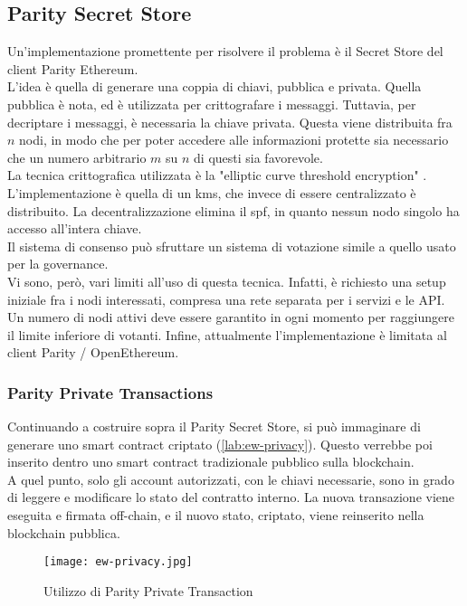 \subsection{Parity Secret Store}
Un'implementazione promettente per risolvere il problema è il Secret Store del client Parity Ethereum. \\
L'idea è quella di generare una coppia di chiavi, pubblica e privata.
Quella pubblica è nota, ed è utilizzata per crittografare i messaggi.
Tuttavia, per decriptare i messaggi, è necessaria la chiave privata.
Questa viene distribuita fra $n$ nodi, in modo che per poter accedere alle informazioni protette sia necessario che un numero arbitrario $m$ su $n$ di questi sia favorevole. \\
La tecnica crittografica utilizzata è la "elliptic curve threshold encryption" \cite{art:ecdkg}. \\
L'implementazione è quella di un \gls{kms}, che invece di essere centralizzato è distribuito.
La decentralizzazione elimina il \gls{spf}, in quanto nessun nodo singolo ha accesso all'intera chiave. \\
Il sistema di consenso può sfruttare un sistema di votazione simile a quello usato per la governance. \\
Vi sono, però, vari limiti all'uso di questa tecnica.
Infatti, è richiesto una setup iniziale fra i nodi interessati, compresa una rete separata per i servizi e le API.
Un numero di nodi attivi deve essere garantito in ogni momento per raggiungere il limite inferiore di votanti.
Infine, attualmente l'implementazione è limitata al client Parity / OpenEthereum.

\subsubsection{Parity Private Transactions}
Continuando a costruire sopra il Parity Secret Store, si può immaginare di generare uno smart contract criptato (\autoref{lab:ew-privacy}).
Questo verrebbe poi inserito dentro uno smart contract tradizionale pubblico sulla blockchain. \\
A quel punto, solo gli account autorizzati, con le chiavi necessarie, sono in grado di leggere e modificare lo stato del contratto interno.
La nuova transazione viene eseguita e firmata off-chain, e il nuovo stato, criptato, viene reinserito nella blockchain pubblica.

\begin{figure}[ht]
    \texttt{[image: ew-privacy.jpg]}
    \centering
    \caption{Utilizzo di Parity Private Transaction \cite{img:ew-privacy}}
    \label{lab:ew-privacy}
\end{figure}

